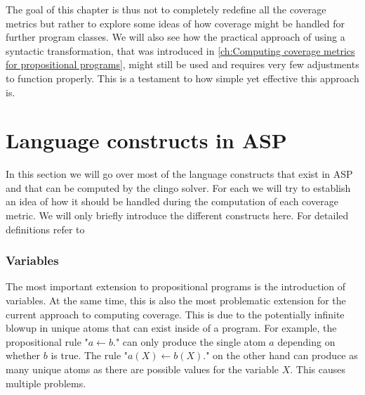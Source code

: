 The goal of this chapter is thus not to completely redefine all the coverage metrics but rather to explore some ideas of how coverage might be handled for further program classes. We will also see how the practical approach of using a syntactic transformation, that was introduced in \cref{ch:Computing coverage metrics for propositional programs}, might still be used and requires very few adjustments to function properly. This is a testament to how simple yet effective this approach is. 

\begin{comment}
- the given definitions of the coverage metrics are only for propositional programs but this is not very practical as most programs 
are more complex than that. They contain many complex language constructs supported by ASP/clingo

-> to make this coverage check actually usable these metrics have to be extended to work for all these constructs

- in general, the label approach should allow me to easily apply these coverage metrics to further program classes with very little 
adjustments!
\end{comment}

\section{Language constructs in ASP}
\label{sec:Coverage for further program classes/Language constructs}
In this section we will go over most of the language constructs that exist in ASP and that can be computed by the clingo solver. For each we will try to establish an idea of how it should be handled during the computation of each coverage metric. We will only briefly introduce the different constructs here. For detailed definitions refer to \cite{Geb+19, Geb+15}

\subsubsection{Variables}
\label{subsubsec:Coverage for further program classes/Language constructs/Variables}
The most important extension to propositional programs is the introduction of variables. At the same time, this is also the most problematic extension for the current approach to computing coverage. This is due to the potentially infinite blowup in unique atoms that can exist inside of a program. For example, the propositional rule "\(a \leftarrow b.\)" can only produce the single atom $a$ depending on whether $b$ is true. The rule "\(a(X) \leftarrow b(X).\)" on the other hand can produce as many unique atoms as there are possible values for the variable $X$. This causes multiple problems.

